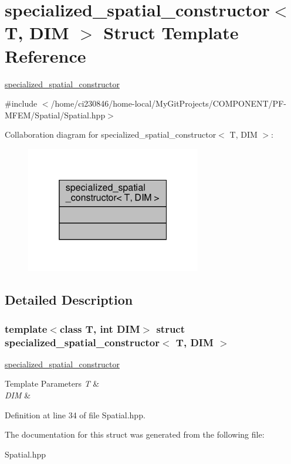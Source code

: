 \hypertarget{structspecialized__spatial__constructor}{}\section{specialized\+\_\+spatial\+\_\+constructor$<$ T, D\+IM $>$ Struct Template Reference}
\label{structspecialized__spatial__constructor}


\hyperlink{structspecialized__spatial__constructor}{specialized\+\_\+spatial\+\_\+constructor}  




{\ttfamily \#include $<$/home/ci230846/home-\/local/\+My\+Git\+Projects/\+C\+O\+M\+P\+O\+N\+E\+N\+T/\+P\+F-\/\+M\+F\+E\+M/\+Spatial/\+Spatial.\+hpp$>$}



Collaboration diagram for specialized\+\_\+spatial\+\_\+constructor$<$ T, D\+IM $>$\+:\nopagebreak
\begin{figure}[H]
\begin{center}
\leavevmode
\includegraphics[width=217pt]{structspecialized__spatial__constructor__coll__graph}
\end{center}
\end{figure}


\subsection{Detailed Description}
\subsubsection*{template$<$class T, int D\+IM$>$\newline
struct specialized\+\_\+spatial\+\_\+constructor$<$ T, D\+I\+M $>$}

\hyperlink{structspecialized__spatial__constructor}{specialized\+\_\+spatial\+\_\+constructor} 


\begin{DoxyTemplParams}{Template Parameters}
{\em T} & \\
\hline
{\em D\+IM} & \\
\hline
\end{DoxyTemplParams}


Definition at line 34 of file Spatial.\+hpp.



The documentation for this struct was generated from the following file\+:\begin{DoxyCompactItemize}
\item 
Spatial.\+hpp\end{DoxyCompactItemize}
